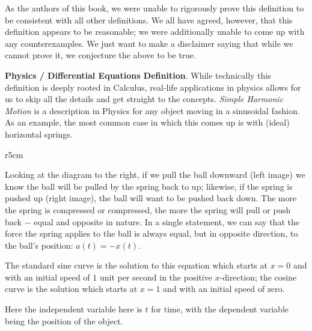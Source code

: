 \documentclass[../book.tex]{subfiles}
\begin{document}
\begin{remark}
As the authors of this book, we were unable to rigorously prove this definition to be consistent with all other definitions. We all have agreed, however, that this definition appears to be reasonable; we were additionally unable to come up with any counterexamples. We just want to make a disclaimer saying that while we cannot prove it, we conjecture the above to be true.
\end{remark}

\textbf{Physics / Differential Equations Definition}. While technically this definition is deeply rooted in Calculus, real-life applications in physics allows for us to skip all the details and get straight to the concepts. \textit{Simple Harmonic Motion} is a description in Physics for any object moving in a sinusoidal fashion. As an example, the most common case in which this comes up is with (ideal) horizontal springs.

\begin{wrapfigure}{r}{5cm}
\end{wrapfigure}

Looking at the diagram to the right, if we pull the ball downward (left image) we know the ball will be pulled by the spring back to up; likewise, if the spring is pushed up (right image), the ball will want to be pushed back down. The more the spring is compressed or compressed, the more the spring will pull or push back $-$ equal and opposite in nature. In a single statement, we can say that the force the spring applies to the ball is always equal, but in opposite direction, to the ball's position: $a(t)=-x(t)$.

The standard sine curve is the solution to this equation which starts at $x=0$ and with an initial speed of $1$ unit per second in the positive $x$-direction; the cosine curve is the solution which starts at $x=1$ and with an initial speed of zero.

\begin{remark}
Here the independent variable here is $t$ for time, with the dependent variable being the position of the object.
\end{remark}
\end{document}
